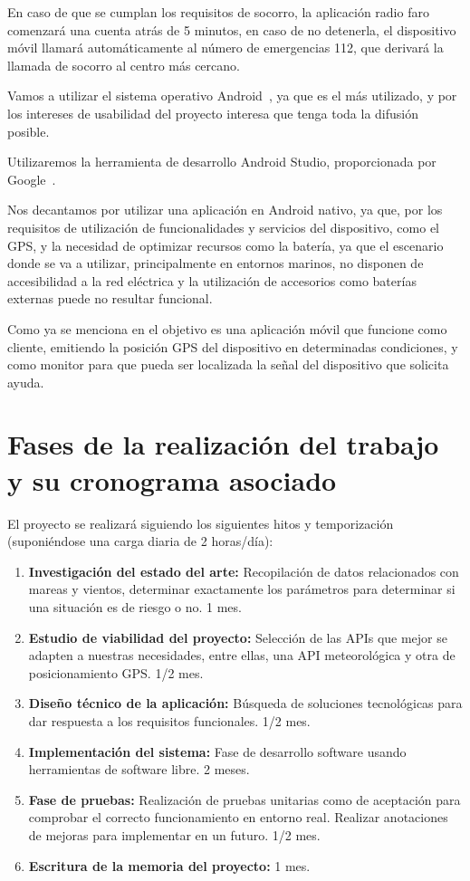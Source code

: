 En caso de que se cumplan los requisitos de socorro, la aplicación radio faro comenzará una cuenta atrás de 5 minutos, en caso de no detenerla, el dispositivo móvil llamará automáticamente al número de emergencias 112, que derivará la llamada de socorro al centro más cercano.

Vamos a utilizar el sistema operativo Android~\cite{Android}, ya que es el más utilizado, y por los intereses de usabilidad del proyecto interesa que tenga toda la difusión posible.

Utilizaremos la herramienta de desarrollo Android Studio, proporcionada por Google~\cite{AS}.

Nos decantamos por utilizar una aplicación en Android nativo, ya que, por los requisitos de utilización de funcionalidades y servicios del dispositivo, como el GPS, y la necesidad de optimizar recursos como la batería, ya que el escenario donde se va a utilizar, principalmente en entornos marinos, no disponen de accesibilidad a la red eléctrica y la utilización de accesorios como baterías externas puede no resultar funcional.


Como ya se menciona en \cite{VRUIZ} el objetivo es una aplicación móvil que funcione como cliente, emitiendo la posición GPS del dispositivo en determinadas condiciones, y como monitor para que pueda ser localizada la señal del dispositivo que solicita ayuda.

\section{Fases de la realización del trabajo y su cronograma asociado}
El proyecto se realizará siguiendo los siguientes hitos y temporización (suponiéndose una carga diaria de 2 horas/día): 
\begin{enumerate}
\item  \textbf{Investigación del 
estado del arte:} Recopilación de datos 
relacionados con mareas y vientos, 
determinar exactamente los parámetros para
 determinar si una situación es de riesgo o no. 1 mes.
\item  \textbf{Estudio de viabilidad del proyecto:} Selección de las APIs que mejor se adapten a nuestras necesidades, entre ellas, una API meteorológica y otra de posicionamiento GPS. 1/2 mes.
\item  \textbf{Diseño técnico de la aplicación:} Búsqueda de soluciones tecnológicas para dar respuesta a los requisitos funcionales. 1/2 mes.
\item  \textbf{Implementación del sistema:} Fase de desarrollo software usando herramientas de software libre. 2 meses.
\item  \textbf{Fase de pruebas:} Realización de pruebas unitarias como de aceptación para comprobar el correcto funcionamiento en entorno real. Realizar anotaciones de mejoras para implementar en un futuro. 1/2 mes.
\item  \textbf{Escritura de la memoria del proyecto:} 1 mes.
\end{enumerate}

